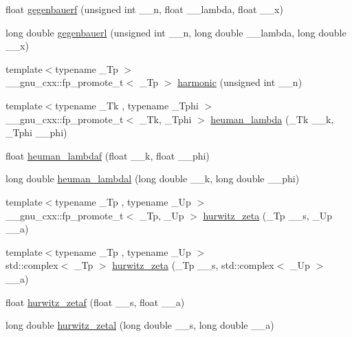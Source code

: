 \begin{DoxyCompactItemize}
float \hyperlink{group__gnu__math__spec__func_ga3eda0a3546848c5b3a2d4d9b5910d6b1}{gegenbauerf} (unsigned int \+\_\+\+\_\+n, float \+\_\+\+\_\+lambda, float \+\_\+\+\_\+x)
\item 
long double \hyperlink{group__gnu__math__spec__func_ga1f1110d7a116bd5636924bb96d24ecc3}{gegenbauerl} (unsigned int \+\_\+\+\_\+n, long double \+\_\+\+\_\+lambda, long double \+\_\+\+\_\+x)
\item 
{\footnotesize template$<$typename \+\_\+\+Tp $>$ }\\\+\_\+\+\_\+gnu\+\_\+cxx\+::fp\+\_\+promote\+\_\+t$<$ \+\_\+\+Tp $>$ \hyperlink{group__gnu__math__spec__func_gab052b72af9c7ec030bcea81965390614}{harmonic} (unsigned int \+\_\+\+\_\+n)
\item 
{\footnotesize template$<$typename \+\_\+\+Tk , typename \+\_\+\+Tphi $>$ }\\\+\_\+\+\_\+gnu\+\_\+cxx\+::fp\+\_\+promote\+\_\+t$<$ \+\_\+\+Tk, \+\_\+\+Tphi $>$ \hyperlink{group__gnu__math__spec__func_ga7537f96eedc8571ed1987481b2863e89}{heuman\+\_\+lambda} (\+\_\+\+Tk \+\_\+\+\_\+k, \+\_\+\+Tphi \+\_\+\+\_\+phi)
\item 
float \hyperlink{group__gnu__math__spec__func_ga10cf5d54d985aa3a58cb197601040ac8}{heuman\+\_\+lambdaf} (float \+\_\+\+\_\+k, float \+\_\+\+\_\+phi)
\item 
long double \hyperlink{group__gnu__math__spec__func_gadadaeb83b3d9c2fccd33ab8ec3188df5}{heuman\+\_\+lambdal} (long double \+\_\+\+\_\+k, long double \+\_\+\+\_\+phi)
\item 
{\footnotesize template$<$typename \+\_\+\+Tp , typename \+\_\+\+Up $>$ }\\\+\_\+\+\_\+gnu\+\_\+cxx\+::fp\+\_\+promote\+\_\+t$<$ \+\_\+\+Tp, \+\_\+\+Up $>$ \hyperlink{group__gnu__math__spec__func_ga7b167ce1c8d9aa6aad40fc83a95733bd}{hurwitz\+\_\+zeta} (\+\_\+\+Tp \+\_\+\+\_\+s, \+\_\+\+Up \+\_\+\+\_\+a)
\item 
{\footnotesize template$<$typename \+\_\+\+Tp , typename \+\_\+\+Up $>$ }\\std\+::complex$<$ \+\_\+\+Tp $>$ \hyperlink{group__gnu__math__spec__func_gaa7f0d1fbba9d2ce07a30d907302d527f}{hurwitz\+\_\+zeta} (\+\_\+\+Tp \+\_\+\+\_\+s, std\+::complex$<$ \+\_\+\+Up $>$ \+\_\+\+\_\+a)
\item 
float \hyperlink{group__gnu__math__spec__func_gaa745d7f2edde060ed2f22817ad89df1f}{hurwitz\+\_\+zetaf} (float \+\_\+\+\_\+s, float \+\_\+\+\_\+a)
\item 
long double \hyperlink{group__gnu__math__spec__func_gad8f2cfc7e198755968bae35d46b49d5a}{hurwitz\+\_\+zetal} (long double \+\_\+\+\_\+s, long double \+\_\+\+\_\+a)

\end{DoxyCompactItemize}
